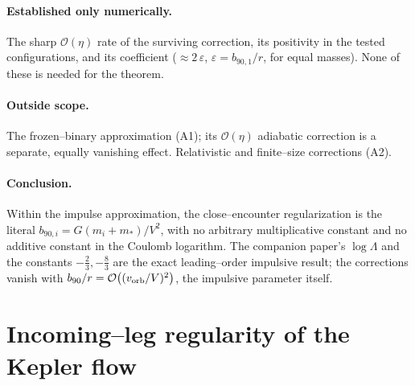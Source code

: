 \documentclass[11pt]{article}
\newcommand{\bnt}{b_{90}}
\newcommand{\order}[1]{\mathcal O\!\left(#1\right)}
\begin{document}
\paragraph{Established only numerically.}
The sharp $\order\eta$ rate of the surviving correction, its positivity in the tested
configurations, and its coefficient ($\approx2\,\varepsilon$, $\varepsilon=b_{90,1}/r$, for equal
masses). None of these is needed
for the theorem.

\paragraph{Outside scope.}
The frozen--binary approximation (A1); its $\order\eta$ adiabatic correction is a separate, equally
vanishing effect. Relativistic and finite--size corrections (A2).

\paragraph{Conclusion.}
Within the impulse approximation, the close--encounter regularization is the literal
$b_{90,i}=G(m_i+m_*)/V^2$, with no arbitrary multiplicative constant and no additive constant in the
Coulomb logarithm. The companion paper's $\log\Lambda$ and the constants $-\tfrac23,-\tfrac83$ are the exact
leading--order impulsive result; the corrections vanish with
$\bnt/r=\order{(v_{\rm orb}/V)^2}$, the impulsive parameter itself.

\appendix

\section{Incoming--leg regularity of the Kepler flow}
\label{app:kepler}
\end{document}
